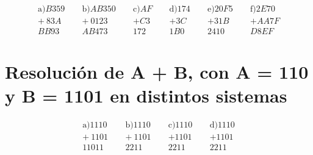 \documentclass[12pt]{article}
\begin{document}
\[
\begin{array}{r}
\text{a)}
  B359 \\
+ \ 83A \\
\hline
  BB93
\end{array}
\quad\
\begin{array}{r}
\text{b)}
  AB350 \\
+ \ 0123 \\
\hline
  AB473
\end{array}
\quad\
\begin{array}{r}
\text{c)}
  AF \\
+ C3 \\
\hline
  172
\end{array}
\quad\
\begin{array}{r}
    \text{d)}
  174 \\
+ 3C \\
\hline
  1B0
\end{array}
\quad\
\begin{array}{r}
    \text{e)}
    20F5 \\
    + 31B\\
    \hline
    2410
\end{array}
\quad\
\begin{array}{r}
    \text{f)}
    2E70 \\
    + AA7F \\
    \hline
    D8EF      
\end{array}
\]

\section{Resolución de A + B, con A = 110 y B = 1101 en distintos sistemas}

\[
\begin{array}{r}
\text{a)}
  1110 \\
+ \ 1101 \\
\hline
  11011
\end{array}
\quad\
\begin{array}{r}
\text{b)}
  1110 \\
+ \ 1101 \\
\hline
  2211
\end{array}
\quad\
\begin{array}{r}
\text{c)}
  1110 \\
+ 1101 \\
\hline
  2211
\end{array}
\quad\
\begin{array}{r}
    \text{d)}
  1110 \\
+ 1101 \\
\hline
  2211
\end{array}
\]
\end{document}
